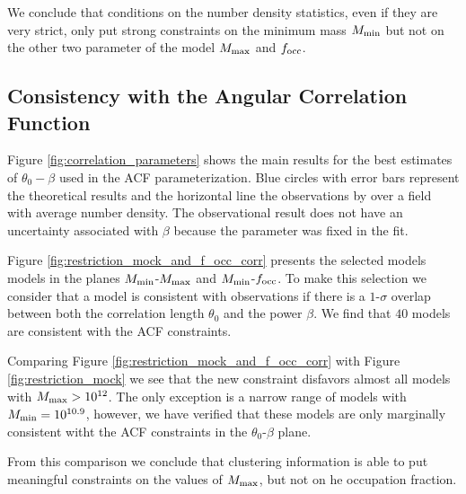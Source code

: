 \documentclass[usenatbib]{mn2e}
\begin{document}
We conclude that conditions on the number density statistics, even if they are
very strict, only put strong constraints on the minimum mass $M_{\rm
  min}$ but not on the other two parameter of the model $M_{\rm max}$
and $f_{\rm occ}$. 



\subsection{Consistency with the Angular Correlation Function}



Figure \ref{fig:correlation_parameters} shows the main results for the
best estimates of $\theta_{0}-\beta$  used in the ACF parameterization. 
Blue circles with error bars represent the theoretical results
and the horizontal line the observations by \cite{Ouchi2010} over a
field with average number density. The  observational result does not
have an uncertainty associated with $\beta$ because the parameter was
fixed in the fit. 

Figure \ref{fig:restriction_mock_and_f_occ_corr} presents the selected models
models in the planes $M_{\rm min}$-$M_{\rm  max}$ and $M_{\rm
  min}$-$f_{\rm occ}$. To make this selection we consider that
a model is consistent with observations if there is a $1$-$\sigma$
overlap between both the correlation length $\theta_0$ and the power
$\beta$.  We find that $40$ models are consistent with the ACF
constraints. 

Comparing Figure
\ref{fig:restriction_mock_and_f_occ_corr} with Figure
\ref{fig:restriction_mock} we see that the new constraint disfavors
almost all models with $M_{\rm max}>10^{12}$. The only exception is 
a narrow range of models with $M_{\rm min}=10^{10.9}$, however, we
have verified that these models are only marginally consistent witht
the ACF constraints in the $\theta_0$-$\beta$ plane.

From this comparison we conclude that clustering  information is able
to put meaningful constraints on the values of $M_{\rm max}$, but not
on he occupation fraction.
\end{document}
